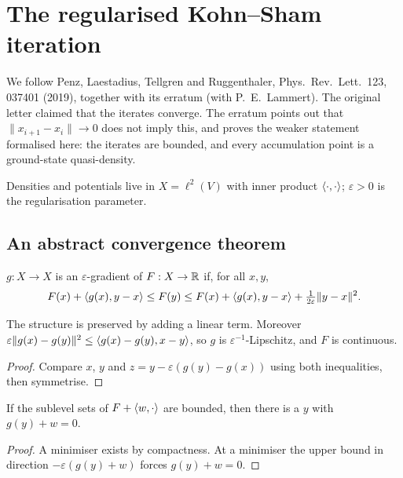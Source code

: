 \section{The regularised Kohn--Sham iteration}

We follow Penz, Laestadius, Tellgren and Ruggenthaler, Phys.~Rev.~Lett.~123, 037401 (2019), together with
its erratum (with P.~E.~Lammert). The original letter claimed that the iterates converge. The erratum
points out that $\|x_{i+1}-x_i\|\to0$ does not imply this, and proves the weaker statement formalised here:
the iterates are bounded, and every accumulation point is a ground-state quasi-density.

Densities and potentials live in $X=\ell^2(V)$ with inner product $\langle \cdot, \cdot\rangle$; $\varepsilon>0$ is
the regularisation parameter.

\subsection{An abstract convergence theorem}

\begin{definition}
  \label{def:IsMYSmooth}
  \leanok
  $g:X\to X$ is an $\varepsilon$-gradient of $F:X\to\mathbb{R}$ if, for all $x,y$,
  \[F(x)+\langle g(x), y-x\rangle\le F(y)\le F(x)+\langle g(x), y-x\rangle+\tfrac1{2\varepsilon}\|y-x\|^2 .\]
\end{definition}

\begin{lemma}[Co-coercivity]
  \label{lem:cocoercive}
  \leanok
  The structure is preserved by adding a linear term. Moreover
  $\varepsilon\|g(x)-g(y)\|^2\le\langle g(x)-g(y), x-y\rangle$, so $g$ is $\varepsilon^{-1}$-Lipschitz, and $F$ is
  continuous.
\end{lemma}
\begin{proof}
  \leanok
  Compare $x$, $y$ and $z=y-\varepsilon(g(y)-g(x))$ using both inequalities, then symmetrise.
\end{proof}

\begin{lemma}
  \label{lem:exists_stationary}
  \leanok
  If the sublevel sets of $F+\langle w, \cdot\rangle$ are bounded, then there is a $y$ with $g(y)+w=0$.
\end{lemma}
\begin{proof}
  \leanok
  A minimiser exists by compactness. At a minimiser the upper bound in direction $-\varepsilon(g(y)+w)$
  forces $g(y)+w=0$.
\end{proof}

